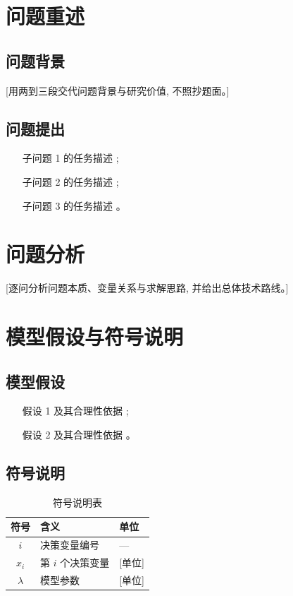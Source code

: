 \documentclass[zihao=-4,a4paper]{ctexart}
\begin{document}
\section{问题重述}

\subsection{问题背景}

[用两到三段交代问题背景与研究价值, 不照抄题面。]

\subsection{问题提出}

\begin{itemize}
  \item [子问题 1 的任务描述];
  \item [子问题 2 的任务描述];
  \item [子问题 3 的任务描述]。
\end{itemize}

\section{问题分析}

[逐问分析问题本质、变量关系与求解思路, 并给出总体技术路线。]

\section{模型假设与符号说明}

\subsection{模型假设}

\begin{enumerate}
  \item [假设 1 及其合理性依据];
  \item [假设 2 及其合理性依据]。
\end{enumerate}

\subsection{符号说明}

\begin{table}[H]
  \centering
  \caption{符号说明表}
  \begin{tabular}{cll}
    \toprule
    符号 & 含义 & 单位 \\
    \midrule
    $i$   & 决策变量编号 & --- \\
    $x_i$ & 第 $i$ 个决策变量 & [单位] \\
    $\lambda$ & 模型参数 & [单位] \\
    \bottomrule
  \end{tabular}
\end{table}
\end{document}
